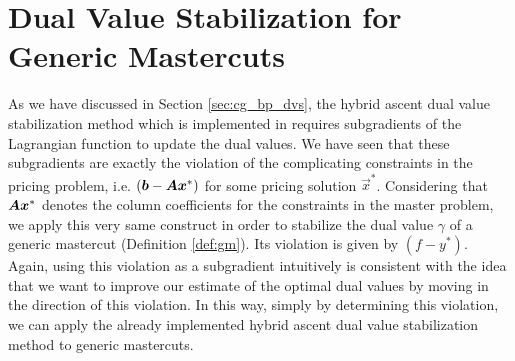 \section{Dual Value Stabilization for Generic Mastercuts}\label{sec:gm_dvs}
As we have discussed in Section \ref{sec:cg_bp_dvs}, the hybrid ascent dual value stabilization method which is implemented in \GCG{} requires subgradients of the Lagrangian function to update the dual values. We have seen that these subgradients are exactly the violation of the complicating constraints in the pricing problem, i.e. $\left( {\bm{b}} - {\bm{A}} {\bm{x}}^* \right)$ for some pricing solution $\vec{x}^*$. Considering that ${\bm{A}} {\bm{x}}^*$ denotes the column coefficients for the constraints in the master problem, we apply this very same construct in order to stabilize the dual value $\gamma$ of a generic mastercut (Definition \ref{def:gm}). Its violation is given by $\left( f - y^* \right)$. Again, using this violation as a subgradient intuitively is consistent with the idea that we want to improve our estimate of the optimal dual values by moving in the direction of this violation. In this way, simply by determining this violation, we can apply the already implemented hybrid ascent dual value stabilization method to generic mastercuts.